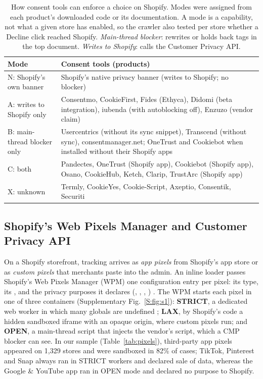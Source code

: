 \begin{table}[!tbp]
\centering
\caption{How consent tools can enforce a choice on Shopify. Modes were assigned from each product's downloaded code or its documentation. A mode is a capability, not what a given store has enabled, so the crawler also tested per store whether a Decline click reached Shopify. \emph{Main-thread blocker}: rewrites or holds back tags in the top document. \emph{Writes to Shopify}: calls the Customer Privacy API.}
\label{tab:cmp-modes}
\small
\begin{tabularx}{\linewidth}{@{}l>{\raggedright\arraybackslash}X@{}}
\toprule
Mode & Consent tools (products) \\
\midrule
N: Shopify's own banner & Shopify's native privacy banner (writes to Shopify; no blocker) \\
A: writes to Shopify only & Consentmo, CookieFirst, Fides (Ethyca), Didomi (beta integration), iubenda (with autoblocking off), Enzuzo (vendor claim) \\
B: main-thread blocker only & Usercentrics (without its sync snippet), Transcend (without sync), consentmanager.net; OneTrust and Cookiebot when installed without their Shopify apps \\
C: both & Pandectes, OneTrust (Shopify app), Cookiebot (Shopify app), Osano, CookieHub, Ketch, Clarip, TrustArc (Shopify app) \\
X: unknown & Termly, CookieYes, Cookie-Script, Axeptio, Consentik, Securiti \\
\bottomrule
\end{tabularx}
\end{table}

\subsection{Shopify's Web Pixels Manager and Customer Privacy API}\label{sec:bg-shopify}

On a Shopify storefront, tracking arrives as \emph{app pixels} from Shopify's app store or as \emph{custom pixels} that merchants paste into the admin. An inline loader passes Shopify's Web Pixels Manager (WPM) one configuration entry per pixel: its type, its , and the privacy purposes it declares (, , , ) \citep{shopify_aboutpixels,shopify_pixelprivacy}. The WPM starts each pixel in one of three containers (Supplementary Fig.~\ref*{S:fig:s1}): \textbf{STRICT}, a dedicated web worker in which many globals are undefined \citep{shopify_aboutpixels}; \textbf{LAX}, by Shopify's code a hidden sandboxed iframe with an opaque origin, where custom pixels run; and \textbf{OPEN}, a main-thread script that injects the vendor's script, which a CMP blocker can see. In our sample (Table~\ref{tab:pixels}), third-party app pixels appeared on 1,329 stores and were sandboxed in 82\% of cases; TikTok, Pinterest and Snap always ran in STRICT workers and declared sale of data, whereas the Google \& YouTube app ran in OPEN mode and declared no purpose to Shopify.

